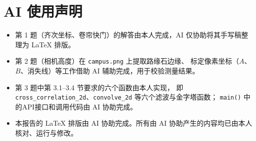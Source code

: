 \documentclass[11pt,a4paper]{ctexart}
\begin{document}
\section{AI 使用声明}

\begin{itemize}
  \item 第 1 题（齐次坐标、卷帘快门）的解答由本人完成，AI 仅协助将其手写稿整理为 \LaTeX{} 排版。
  \item 第 2 题（相机高度）在 \texttt{campus.png} 上提取路缘石边缘、
        标定像素坐标（$A$、$B$、消失线）等工作借助 AI 辅助完成，用于校验测量结果。
  \item 第 3 题中第 3.1--3.4 节要求的六个函数由本人实现，
        即 \texttt{cross\_correlation\_2d}、\texttt{convolve\_2d} 等六个滤波与金字塔函数；
        \texttt{main()} 中的API接口和调用代码由 AI 协助完成。
  \item 本报告的 \LaTeX{} 排版由 AI 协助完成。所有由 AI 协助产生的内容均已由本人核对、运行与修改。
\end{itemize}
\end{document}
